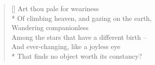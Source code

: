 \documentclass[MAIN]{subfiles}
\begin{document}
\settowidth{\versewidth}{Of climbing heaven, and gazing on the earth,}
\begin{verse}[\versewidth]
\vin Art thou pale for weariness\\*
Of climbing heaven, and gazing on the earth,\\
\vin Wandering companionless\\
Among the stars that have a different birth --\\
And ever-changing, like a joyless eye\\*
That finds no object worth its constancy?
\end{verse}
\end{document}
